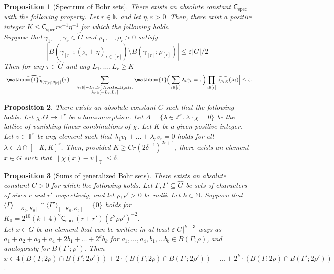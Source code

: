 \documentclass[10pt,a4paper]{amsart}
\newtheorem{proposition}{Proposition}
\newcommand\id{\mathbbm{1}}
\newcommand{\on}[1]{
	\operatorname{#1}
}
\newcommand\ssk[1]{
	\substack{#1}
}
\begin{document}
\begin{proposition}[Spectrum of Bohr sets]\label{bohrsizeLargeFC} There exists an absolute constant $\mathsf{C}_{\on{spec}}$ with the following property. Let $r\in \mathbb{N}$ and let $\eta, \varepsilon > 0$. Then, there exist a positive integer $K \leq \mathsf{C}_{\on{spec}} r \varepsilon^{-1} \eta^{-1}$ for which the following holds.\\
\indent Suppose that $\gamma_1, \dots, \gamma_r \in \hat{G}$ and $\rho_1, \dots, \rho_r > 0$ satisfy 
\begin{equation}|B(\gamma_{[r]}; (\rho_i + \eta)_{i \in [r]}) \setminus B(\gamma_{[r]}; \rho_{[r]})| \leq \varepsilon |G|/2.\label{weakregforbohrfcapprox}\end{equation}
Then for any $\tau \in \hat{G}$ and any $L_1, \dots, L_r \geq K$
\[\Big|\widehat{\id_{B(\gamma_{[r]}; \rho_{[r]})}}(\tau) - \sum_{\ssk{\lambda_1 \in [-L_1, L_1], \dots, \\\lambda_r \in [-L_r, L_r]}} \id\Big(\sum_{i \in [r]} \lambda_i \gamma_i = \tau\Big) \prod_{i \in [r]} \widehat{\mathsf{b}_{\rho_i, \eta}}(\lambda_i)\Big| \leq \varepsilon.\]
\end{proposition}

\begin{proposition}\label{approximatelatticeimage}
    There exists an absolute constant $C$ such that the following holds. Let $\chi : G \to \mathbb{T}^r$ be a homomorphism. Let $\Lambda = \{\lambda \in \mathbb{Z}^r : \lambda \cdot \chi = 0\}$ be the lattice of vanishing linear combinations of $\chi$. Let $K$ be a given positive integer. Let $v \in \mathbb{T}^r$ be any element such that $\lambda_1 v_1 + \dots + \lambda_r v_r = 0$ holds for all $\lambda \in \Lambda \cap [-K, K]^r$. Then, provided $K \geq C r  (2\delta^{-1})^{2r + 1}$, there exists an element $x \in G$ such that $\|\chi(x) -v\|_{\mathbb{T}} \leq \delta$.
\end{proposition}

\begin{proposition}[Sums of generalized Bohr sets]\label{sumsofgenbohrs}
    There exists an absolute constant $C > 0$ for which the following holds. Let $\Gamma, \Gamma' \subseteq \hat{G}$ be sets of characters of sizes $r$ and $r'$ respectively, and let $\rho, \rho' > 0$ be radii. Let $k \in \mathbb{N}$. Suppose that $\langle\Gamma\rangle_{[-K_0, K_0]} \cap \langle\Gamma'\rangle_{[-K_0, K_0]} = \{0\}$ holds for $K_0 = 2^{10}(k+4)^2\mathsf{C}_{\on{spec}} (r + r') (\varepsilon^{2} \rho\rho')^{-2}$.\\
    \indent Let $x \in G$ be an element that can be written in at least $\varepsilon |G|^{k + 3}$ ways as $a_1 + a_2 + a_3 + a_4 + 2b_1 + \dots + 2^k b_k$ for $a_1, \dots, a_4, b_1, \dots b_k \in  B(\Gamma; \rho)$, and analogously for $ B(\Gamma'; \rho')$. Then $x \in 4(B(\Gamma; 2\rho) \cap B(\Gamma'; 2\rho')) + 2\cdot (B(\Gamma; 2\rho) \cap B(\Gamma'; 2\rho')) + \dots + 2^k \cdot (B(\Gamma; 2\rho) \cap B(\Gamma'; 2\rho'))$.
\end{proposition}
\end{document}
